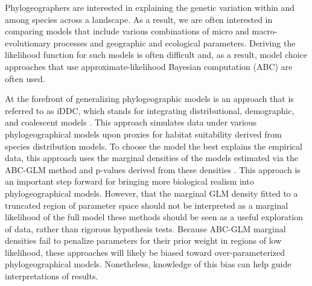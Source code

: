 Phylogeographers are interested in explaining the genetic variation within and
among species across a landscape.
As a result, we are often interested in comparing models that include
various combinations of micro and macro-evolutionary processes and geographic
and ecological parameters.
Deriving the likelihood function for such models is often difficult and, as a
result, model choice approaches that use approximate-likelihood Bayesian
computation (ABC) are often used.

At the forefront of generalizing phylogeographic models is an approach that is
referred to as iDDC, which stands for integrating distributional, demographic,
and coalescent models \citep{Papadopoulou2016}.
This approach simulates data under various phylogeographical models upon
proxies for habitat suitability derived from species distribution models.
To choose the model the best explains the empirical data, this approach uses
the marginal densities of the models estimated via the ABC-GLM method and
p-values derived from these densities
\citep{He2013}
\citep{Massatti2016}
\citep{Bemmels2016}
\citep{Knowles2017}
\citep{Papadopoulou2016}.
This approach is an important step forward for bringing more biological realism
into phylogeographical models.
However, 
that the marginal GLM density fitted to a truncated region of parameter space
should not be interpreted as a marginal likelihood of the full
model
these methods should be seen as a useful exploration of data, rather than
rigorous hypothesis tests.
Because ABC-GLM marginal densities fail to penalize parameters for their
prior weight in regions of low likelihood, these approaches will likely
be biased toward over-parameterized phylogeographical models.
Nonetheless, knowledge of this bias can help guide interpretations of results.



